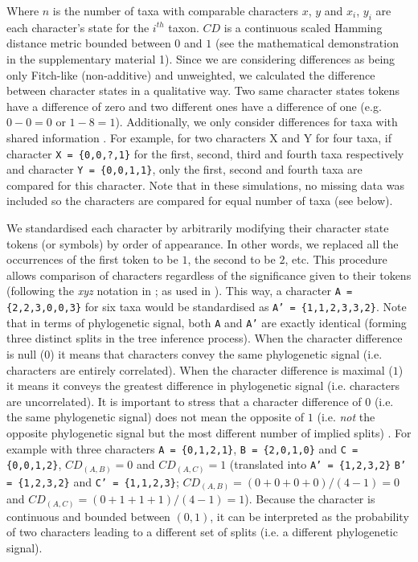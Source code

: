 \documentclass[12pt,letterpaper]{article}
\begin{document}
\noindent Where $n$ is the number of taxa with comparable characters $x$, $y$ and $x_i$, $y_i$ are each character's state for the $i^{th}$ taxon.
$CD$ is a continuous scaled Hamming distance metric bounded between $0$ and $1$ (see the mathematical demonstration in the supplementary material 1).
Since we are considering differences as being only Fitch-like (non-additive) and unweighted, we calculated the difference between character states in a qualitative way.
Two same character states tokens have a difference of zero and two different ones have a difference of one (e.g. $0 - 0 = 0$ or $1 - 8 = 1$).
Additionally, we only consider differences for taxa with shared information \citep[i.e. a Gower distance;][]{GowerDist}.
For example, for two characters X and Y for four taxa, if character \texttt{X = \{0,0,?,1\}} for the first, second, third and fourth taxa respectively and character \texttt{Y = \{0,0,1,1\}}, only the first, second and fourth taxa are compared for this character.
Note that in these simulations, no missing data was included so the characters are compared for equal number of taxa (see below).

We standardised each character by arbitrarily modifying their character state tokens (or symbols) by order of appearance.
In other words, we replaced all the occurrences of the first token to be $1$, the second to be $2$, etc.
This procedure allows comparison of characters regardless of the significance given to their tokens (following the \textit{xyz} notation in \citealt{felsenstein2004inferring}; as used in \citealt{Davalos01072014}).
This way, a character \texttt{A = \{2,2,3,0,0,3\}} for six taxa would be standardised as \texttt{A' = \{1,1,2,3,3,2\}}.
Note that in terms of phylogenetic signal, both \texttt{A} and \texttt{A'} are exactly identical (forming three distinct splits in the tree inference process).
When the character difference is null ($0$) it means that characters convey the same phylogenetic signal (i.e. characters are entirely correlated).
When the character difference is maximal ($1$) it means it conveys the greatest difference in phylogenetic signal (i.e. characters are uncorrelated).
It is important to stress that a character difference of $0$ (i.e. the same phylogenetic signal) does not mean the opposite of $1$ (i.e. \textit{not} the opposite phylogenetic signal but the most different number of implied splits) .
For example with three characters \texttt{A = \{0,1,2,1\}}, \texttt{B = \{2,0,1,0\}} and \texttt{C = \{0,0,1,2\}}, $CD_{(A,B)} = 0$ and $CD_{(A,C)} = 1$ (translated into \texttt{A' = \{1,2,3,2\}} \texttt{B' = \{1,2,3,2\}} and \texttt{C' = \{1,1,2,3\}}; $CD_{(A,B)} = (0+0+0+0)/(4-1) = 0$ and $CD_{(A,C)} = (0+1+1+1)/(4-1) = 1$).
Because the character is continuous and bounded between $(0,1)$, it can be interpreted as the probability of two characters leading to a different set of splits (i.e. a different phylogenetic signal).
\end{document}
